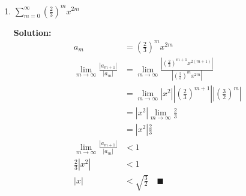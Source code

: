 \documentclass[letterpaper, fontsize=11pt]{scrartcl} %
\numberwithin{equation}{section} %
\numberwithin{figure}{section} %
\numberwithin{table}{section} %
\begin{document}
\begin{enumerate}
\begin{enumerate}
\item $\sum\limits_{m=0}^\infty \left(\frac{2}{3}\right)^m x^{2m}$
\par \textbf{Solution:}
\begin{align*}
a_m &= \left(\frac{2}{3}\right)^m x^{2m}\\
\lim_{m\to \infty} \frac{|a_{m+1}|}{|a_m|} &= \lim_{m\to \infty} \frac{\left|\left(\frac{2}{3}\right)^{m+1}x^{2(m+1)}\right|}{\left|\left(\frac{2}{3}\right)^mx^{2m}\right|}\\
&= \lim_{m\to \infty} \left|x^2\right| \left|\left(\frac{2}{3}\right)^{m+1}\right| \left|\left(\frac{3}{2}\right)^m\right| \\
&= \left|x^2\right| \lim_{m\to \infty}\frac{2}{3}\\
&= \left|x^2\right| \frac{2}{3}\\
\lim_{m\to \infty} \frac{|a_{m+1}|}{|a_m|} &< 1\\
\frac{2}{3} \left|x^2\right| &< 1 \\
 |x| &< \sqrt{\frac{3}{2}}\quad \blacksquare
\end{align*}

\end{enumerate}


\end{enumerate}
\end{document}
